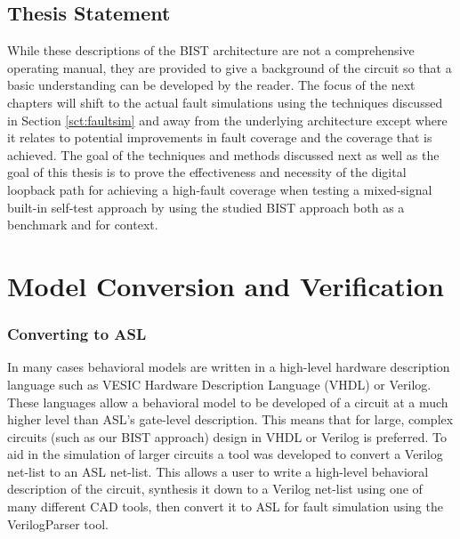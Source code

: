 \documentclass[12pt]{report}
\begin{document}
\section{Thesis Statement}
While these descriptions of the BIST architecture are not a comprehensive operating manual, they are provided to give a background of the circuit so that a basic understanding can be developed by the reader.  The focus of the next chapters will shift to the actual fault simulations using the techniques discussed in Section \ref{sct:faultsim} and away from the underlying architecture except where it relates to potential improvements in fault coverage and the coverage that is achieved.  The goal of the techniques and methods discussed next as well as the goal of this thesis is to prove the effectiveness and necessity of the digital loopback path for achieving a high-fault coverage when testing a mixed-signal built-in self-test approach by using the studied BIST approach both as a benchmark and for context.
 

\chapter{Model Conversion and Verification}
\subsection{Converting to ASL}
In many cases behavioral models are written in a high-level hardware description language such as VESIC Hardware Description Language (VHDL) or Verilog.  These languages allow a behavioral model to be developed of a circuit at a much higher level than ASL's gate-level description.  This means that for large, complex circuits (such as our BIST approach) design in VHDL or Verilog is preferred.  To aid in the simulation of larger circuits a tool was developed to convert a Verilog net-list to an ASL net-list.  This allows a user to write a high-level behavioral description of the circuit, synthesis it down to a Verilog net-list using one of many different CAD tools, then convert it to ASL for fault simulation using the VerilogParser tool.
\end{document}
